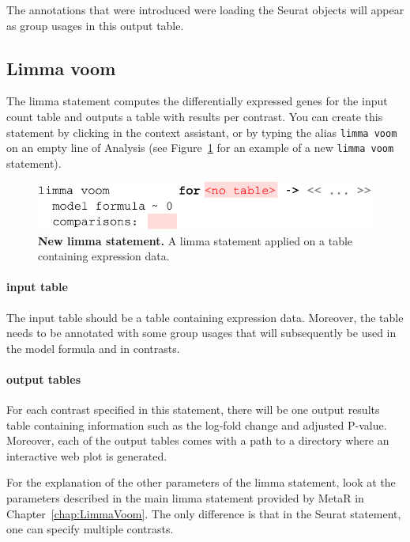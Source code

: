 The annotations that were introduced were loading the Seurat objects will appear as group
usages in this output table.

\subsection{Limma voom}
The limma statement computes the differentially expressed genes for the input count table and outputs
a table with results per contrast. You can create this statement by clicking
 in the context assistant, or by typing
the alias \texttt{limma voom} on an empty line of Analysis (see Figure~\ref{fig:LimmaSeurat}
for an example of a new \texttt{limma voom} statement).

\begin{figure}[h!tbp]
  \centering
    \includegraphics[width=\figWidthWide]{figures/LimmaSeurat.pdf}
    \caption[New limma statement.]{\textbf{New limma statement.} A limma statement applied on
    a table containing expression data.}
\label{fig:LimmaSeurat}
\end{figure}

\paragraph{input table} The input table should be a table containing expression data. Moreover,
the table needs to be annotated with some group usages that will subsequently be used in the
model formula and in contrasts.

\paragraph{output tables} For each contrast specified in this statement, there will be one
output results table containing information such as the log-fold change and adjusted P-value.
Moreover, each of the output tables comes with a path to a directory where an interactive
web plot is generated.

For the explanation of the other parameters of the limma statement, look at the parameters described in the
main limma statement provided by MetaR in Chapter~\ref{chap:LimmaVoom}. The only difference is that
in the Seurat statement, one can specify multiple contrasts.

